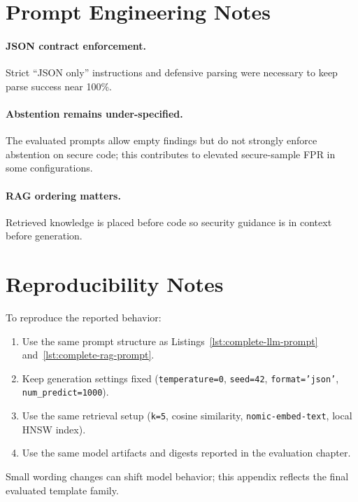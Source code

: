 \section{Prompt Engineering Notes}

\paragraph{JSON contract enforcement.}
Strict ``JSON only'' instructions and defensive parsing were necessary to keep parse success near 100\%.

\paragraph{Abstention remains under-specified.}
The evaluated prompts allow empty findings but do not strongly enforce abstention on secure code; this contributes to elevated secure-sample FPR in some configurations.

\paragraph{RAG ordering matters.}
Retrieved knowledge is placed before code so security guidance is in context before generation.

\section{Reproducibility Notes}

To reproduce the reported behavior:
\begin{enumerate}
  \item Use the same prompt structure as Listings~\ref{lst:complete-llm-prompt} and~\ref{lst:complete-rag-prompt}.
  \item Keep generation settings fixed (\texttt{temperature=0}, \texttt{seed=42}, \texttt{format='json'}, \texttt{num\_predict=1000}).
  \item Use the same retrieval setup (\texttt{k=5}, cosine similarity, \texttt{nomic-embed-text}, local HNSW index).
  \item Use the same model artifacts and digests reported in the evaluation chapter.
\end{enumerate}

Small wording changes can shift model behavior; this appendix reflects the final evaluated template family.

